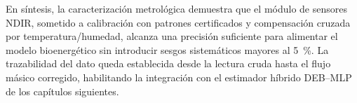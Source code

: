 En síntesis, la caracterización metrológica demuestra que el módulo de sensores NDIR, sometido a calibración con patrones certificados y compensación cruzada por temperatura/humedad, alcanza una precisión suficiente para alimentar el modelo bioenergético sin introducir sesgos sistemáticos mayores al \SI{5}{\percent}. La trazabilidad del dato queda establecida desde la lectura cruda hasta el flujo másico corregido, habilitando la integración con el estimador híbrido DEB--MLP de los capítulos siguientes.